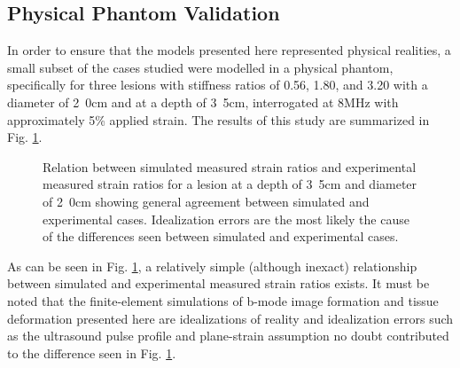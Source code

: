 		\subsection{Physical Phantom Validation}
			In order to ensure that the models presented here represented physical realities, a small subset of the cases studied were modelled in a physical phantom, specifically for three lesions with stiffness ratios of 0.56, 1.80, and 3.20 with a diameter of \unit{2.0}{cm} and at a depth of \unit{3.5}{cm}, interrogated at \unit{8}{MHz} with approximately \unit{5}{\%} applied strain. The results of this study are summarized in Fig. \ref{fig:phantom_validation}.

			\begin{figure}[!t]
				\centering
				\caption[Experimental validation]{Relation between simulated measured strain ratios and experimental measured strain ratios for a lesion at a depth of \unit{3.5}{cm} and diameter of \unit{2.0}{cm} showing general agreement between simulated and experimental cases. Idealization errors are the most likely the cause of the differences seen between simulated and experimental cases.}
				\label{fig:phantom_validation}
			\end{figure}

			As can be seen in Fig. \ref{fig:phantom_validation}, a relatively simple (although inexact) relationship between simulated and experimental measured strain ratios exists. It must be noted that the finite-element simulations of b-mode image formation and tissue deformation presented here are idealizations of reality and idealization errors such as the ultrasound pulse profile and plane-strain assumption no doubt contributed to the difference seen in Fig. \ref{fig:phantom_validation}.

